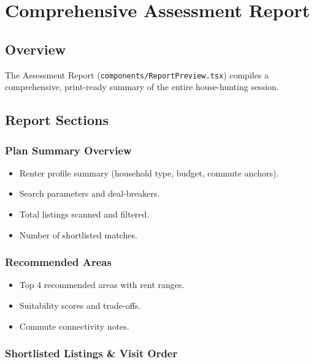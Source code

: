 \documentclass[12pt, a4paper, oneside]{report}
\newcommand{\filepath}[1]{\texttt{\small\color{codeblue}#1}}
\begin{document}
\chapter{Comprehensive Assessment Report}

\section{Overview}

The Assessment Report (\filepath{components/ReportPreview.tsx}) compiles a comprehensive, print-ready summary of the entire house-hunting session.

\section{Report Sections}

\subsection{Plan Summary Overview}

\begin{itemize}[leftmargin=2em]
  \item Renter profile summary (household type, budget, commute anchors).
  \item Search parameters and deal-breakers.
  \item Total listings scanned and filtered.
  \item Number of shortlisted matches.
\end{itemize}

\subsection{Recommended Areas}

\begin{itemize}[leftmargin=2em]
  \item Top 4 recommended areas with rent ranges.
  \item Suitability scores and trade-offs.
  \item Commute connectivity notes.
\end{itemize}

\subsection{Shortlisted Listings \& Visit Order}
\end{document}
